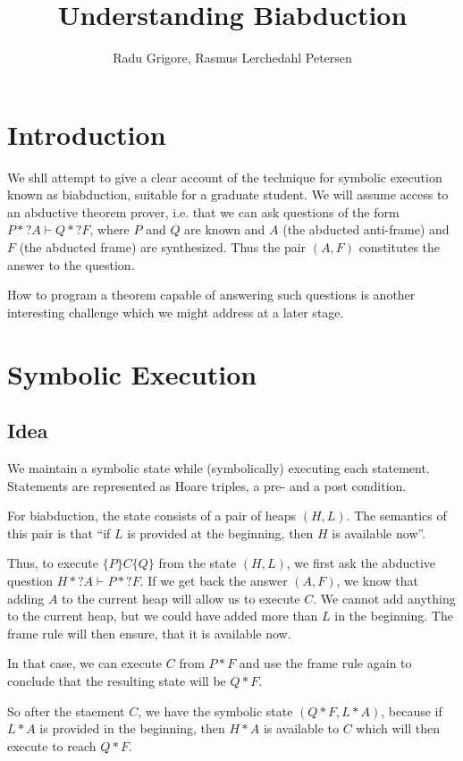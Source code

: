 \documentclass{article}
\title{Understanding Biabduction}
\author{Radu Grigore, Rasmus Lerchedahl Petersen}
\newcommand{\ts}{\vdash}
\newcommand{\hoare}[3]{\{#1\}#2\{#3\}}
\begin{document}
\maketitle
\section{Introduction}\label{sec:intro}
We shll attempt to give a clear account of the technique for symbolic
execution known as biabduction, suitable for a graduate student. We
will assume access to an abductive theorem prover, i.e. that we can
ask questions of the form $P * ?A \ts Q *?F$, where $P$ and $Q$ are
known and $A$ (the abducted anti-frame) and $F$ (the abducted frame)
are synthesized. Thus the pair $(A, F)$ constitutes the answer to the
question.

How to program a theorem capable of answering such questions is
another interesting challenge which we might address at a later stage.
\section{Symbolic Execution}\label{sec:symbexe}
\subsection{Idea}\label{sec:symbexe:idea}
We maintain a symbolic state while (symbolically) executing each
statement. Statements are represented as Hoare triples, a pre- and a
post condition.

For biabduction, the state consists of a pair of heaps $(H, L)$. The
semantics of this pair is that ``if $L$ is provided at the beginning,
then $H$ is available now''.

Thus, to execute $\hoare P C Q$ from the state $(H, L)$, we first ask
the abductive question $H * ?A \ts P * ?F$. If we get back the answer
$(A, F)$, we know that adding $A$ to the current heap will allow us to
execute $C$. We cannot add anything to the current heap, but we could
have added more than $L$ in the beginning. The frame rule will then
ensure, that it is available now.

In that case, we can execute $C$ from $P * F$ and use the frame rule
again to conclude that the resulting state will be $Q * F$.

So after the staement $C$, we have the symbolic state $(Q * F, L *
A)$, because if $L * A$ is provided in the beginning, then $H * A$ is
available to $C$ which will then execute to reach $Q * F$.
\end{document}
